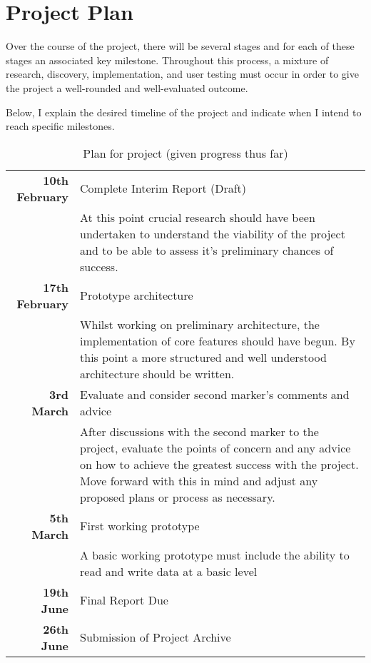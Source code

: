 \section{Project Plan}

Over the course of the project, there will be several stages and for each of these stages an associated key milestone. Throughout this process, a mixture of research, discovery, implementation, and user testing must occur in order to give the project a well-rounded and well-evaluated outcome.

Below, I explain the desired timeline of the project and indicate when I intend to reach specific milestones.

\vspace{5 mm}
\begin{table}[!h]
  \centering
  \begin{tabularx}{0.9\textwidth}{ r | X }
    \textbf{10th February} & Complete Interim Report (Draft) \\
                           & At this point crucial research should have been undertaken to understand the viability of the project and to be able to assess it's preliminary chances of success. \\
                           [4ex]
    \textbf{17th February} & Prototype architecture \\
                           & Whilst working on preliminary architecture, the implementation of core features should have begun. By this point a more structured and well understood architecture should be written. \\
                           [4ex]
    \textbf{3rd March}     & Evaluate and consider second marker's comments
                           and advice \\
                           & After discussions with the second marker to the project, evaluate the points of concern and any advice on how to achieve the greatest success with the project. Move forward with this in mind and adjust any proposed plans or process as necessary. \\
                           [4ex]
    \textbf{5th March}     & First working prototype \\
                           & A basic working prototype must include the ability to read and write data at a basic level \\
                           [4ex]
    \textbf{19th June}     & Final Report Due \\
                           [4ex]
    \textbf{26th June}     & Submission of Project Archive
  \end{tabularx}
  \vspace{10 mm}
  \caption{
    Plan for project (given progress thus far)
  }
  \label{table:project_plan}
\end{table}

